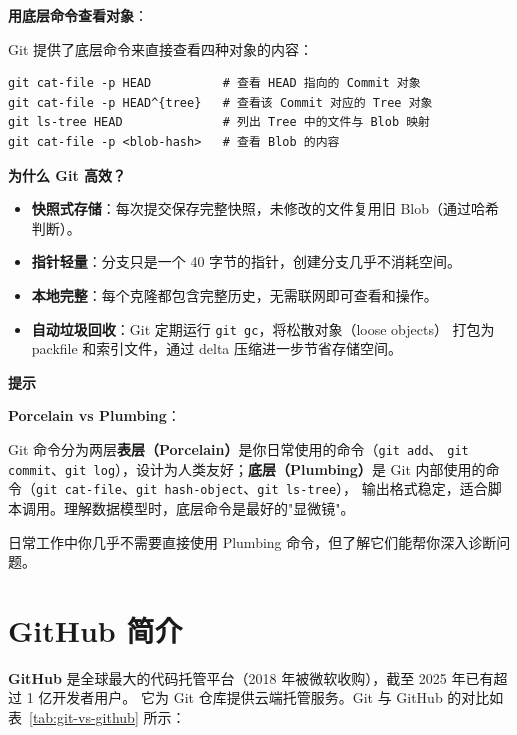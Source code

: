 \documentclass[12pt,a4paper,openany]{ctexbook}
\newenvironment{tipbox}{%
  \medskip
  \noindent\textbf{\faLightbulb\; 提示}
  \smallskip
}{%
  \medskip
}
\begin{document}
\begin{infobox}
\textbf{用底层命令查看对象}：

Git 提供了底层命令来直接查看四种对象的内容：
\begin{lstlisting}[style=shellinbox]
git cat-file -p HEAD          # 查看 HEAD 指向的 Commit 对象
git cat-file -p HEAD^{tree}   # 查看该 Commit 对应的 Tree 对象
git ls-tree HEAD              # 列出 Tree 中的文件与 Blob 映射
git cat-file -p <blob-hash>   # 查看 Blob 的内容
\end{lstlisting}
\end{infobox}

\begin{infobox}
\textbf{为什么 Git 高效？}
\begin{itemize}
  \item \textbf{快照式存储}：每次提交保存完整快照，未修改的文件复用旧 Blob（通过哈希判断）。
  \item \textbf{指针轻量}：分支只是一个 40 字节的指针，创建分支几乎不消耗空间。
  \item \textbf{本地完整}：每个克隆都包含完整历史，无需联网即可查看和操作。
  \item \textbf{自动垃圾回收}：Git 定期运行 \texttt{git gc}，将松散对象（loose objects）
        打包为 packfile 和索引文件，通过 delta 压缩进一步节省存储空间。
\end{itemize}
\end{infobox}

\begin{tipbox}
\textbf{Porcelain vs Plumbing}：

Git 命令分为两层\textbf{表层（Porcelain）}是你日常使用的命令（\texttt{git add}、
\texttt{git commit}、\texttt{git log}），设计为人类友好；\textbf{底层（Plumbing）}是 Git
内部使用的命令（\texttt{git cat-file}、\texttt{git hash-object}、\texttt{git ls-tree}），
输出格式稳定，适合脚本调用。理解数据模型时，底层命令是最好的"显微镜"。

日常工作中你几乎不需要直接使用 Plumbing 命令，但了解它们能帮你深入诊断问题。
\end{tipbox}

\section{GitHub 简介}

\textbf{GitHub} 是全球最大的代码托管平台（2018 年被微软收购），截至 2025 年已有超过 1 亿开发者用户。
它为 Git 仓库提供云端托管服务。Git 与 GitHub 的对比如表~\ref{tab:git-vs-github} 所示：
\end{document}
